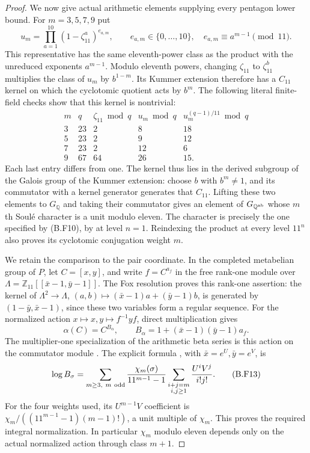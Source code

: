 \begin{proof}
We now give actual arithmetic elements supplying every
pentagon lower bound. For $m=3,5,7,9$ put
\[
 u_m=\prod_{a=1}^{10}(1-\zeta_{11}^a)^{e_{a,m}},\qquad
 e_{a,m}\in\{0,\ldots,10\},\quad
 e_{a,m}\equiv a^{m-1}\pmod{11}.                  \tag{B.F10}
\]
This representative has the same eleventh-power class as the
product with the unreduced exponents $a^{m-1}$.
Modulo eleventh powers, changing $\zeta_{11}$ to
$\zeta_{11}^b$ multiplies the class of $u_m$ by $b^{1-m}$.
Its Kummer extension therefore has a $C_{11}$ kernel on
which the cyclotomic quotient acts by $b^m$. The following
literal finite-field checks show that this kernel is
nontrivial:
\[
\begin{array}{c|r|r|r|r}
 m&q&\zeta_{11}\bmod q&u_m\bmod q&u_m^{(q-1)/11}\bmod q\\\hline
 3&23&2&8&18\\
 5&23&2&9&12\\
 7&23&2&12&6\\
 9&67&64&26&15.
\end{array}                                                 \tag{B.F11}
\]
Each last entry differs from one. The kernel thus lies in
the derived subgroup of the Galois group of the Kummer
extension: choose $b$ with $b^m\ne1$, and its commutator
with a kernel generator generates that $C_{11}$. Lifting
these two elements to $G_{\mathbb Q}$ and taking their
commutator gives an element of $G_{\mathbb Q^{\rm ab}}$
whose $m$th Soul\'e character is a unit modulo eleven.
The character is precisely the one specified by (B.F10),
by \cite[equation (1.2)]{NSW2017} at level $n=1$.
Reindexing the product at every level $11^n$ also proves
its cyclotomic conjugation weight $m$.

We retain the comparison to the pair coordinate. In the
completed metabelian group of $P$, let $C=[x,y]$, and write
$f=C^{a_f}$ in the free rank-one module over
$\Lambda=\mathbb Z_{11}[[\bar x-1,\bar y-1]]$. The Fox
resolution proves this rank-one assertion: the kernel of
$\Lambda^2\to\Lambda$, $(a,b)\mapsto(\bar x-1)a+
(\bar y-1)b$, is generated by
$(1-\bar y,\bar x-1)$, since these two variables form a
regular sequence. For the normalized action
$x\mapsto x,y\mapsto f^{-1}yf$, direct multiplication gives
\[
 \alpha(C)=C^{B_\alpha},\qquad
 B_\alpha=1+(\bar x-1)(\bar y-1)a_f.                     \tag{B.F12}
\]
The multiplier-one specialization of the arithmetic beta
series is this action on the commutator module
\cite[Section 0.2]{Nakamura2019}. The explicit formula
\cite[equation (1.1)]{NSW2017}, with
$\bar x=e^U,\bar y=e^V$, is
\[
 \log B_\sigma=
 \sum_{m\ge3,\ m\ {\rm odd}}
 \frac{\chi_m(\sigma)}{11^{m-1}-1}
 \sum_{\substack{i+j=m\\i,j\ge1}}\frac{U^iV^j}{i!j!}.   \tag{B.F13}
\]
For the four weights used, its $U^{m-1}V$ coefficient is
$\chi_m/((11^{m-1}-1)(m-1)!)$, a unit multiple of
$\chi_m$. This proves the required integral normalization.
In particular $\chi_m$ modulo eleven depends only on the
actual normalized action through class $m+1$.


\end{proof}
